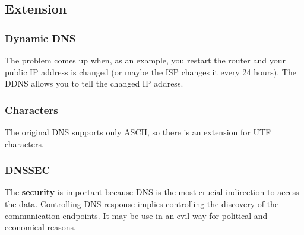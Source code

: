 \subsection{Extension}
\subsubsection{Dynamic DNS}
The problem comes up when, as an example, you restart the router and your public IP address is changed (or maybe the ISP changes it every 24 hours). The DDNS allows you to tell the changed IP address.
\subsubsection{Characters}
The original DNS supports only ASCII, so there is an extension for UTF characters.
\subsubsection{DNSSEC}
The \textbf{security} is important because DNS is the most crucial indirection to access the data. Controlling DNS response implies controlling the discovery of the communication endpoints. It may be use in an evil way for political and economical reasons.